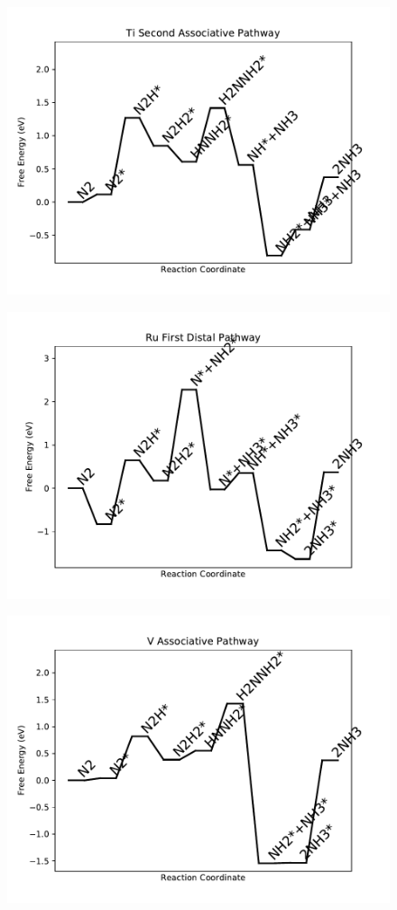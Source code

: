 \begin{figure}
\centering
\includegraphics[width=0.8\linewidth]{data/plots/Ti_associative_2.pdf}
\end{figure}

\begin{figure}
\centering
\includegraphics[width=0.8\linewidth]{data/plots/Ru_distal_1.pdf}
\end{figure}

\begin{figure}
\centering
\includegraphics[width=0.8\linewidth]{data/plots/V_associative.pdf}
\end{figure}


